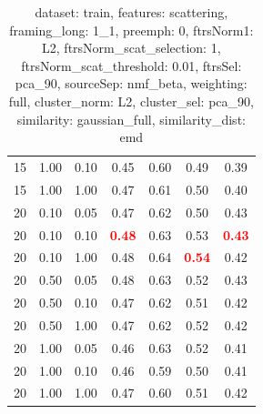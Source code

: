 \documentclass[12pt,a4paper,fleqn]{tufte-handout}
\begin{document}
\begin{table}
\begin{center}
\begin{tabular}{lllcccc}
15 & 1.00 & 0.10 & 0.45 & 0.60 & 0.49 & 0.39 \\    
15 & 1.00 & 1.00 & 0.47 & 0.61 & 0.50 & 0.40 \\    
20 & 0.10 & 0.05 & 0.47 & 0.62 & 0.50 & 0.43 \\    
20 & 0.10 & 0.10 & \textbf{\textcolor{red}{0.48}} & 0.63 & 0.53 & \textbf{\textcolor{red}{0.43}} \\    
20 & 0.10 & 1.00 & 0.48 & 0.64 & \textbf{\textcolor{red}{0.54}} & 0.42 \\    
20 & 0.50 & 0.05 & 0.48 & 0.63 & 0.52 & 0.43 \\    
20 & 0.50 & 0.10 & 0.47 & 0.62 & 0.51 & 0.42 \\    
20 & 0.50 & 1.00 & 0.47 & 0.62 & 0.52 & 0.42 \\    
20 & 1.00 & 0.05 & 0.46 & 0.63 & 0.52 & 0.41 \\    
20 & 1.00 & 0.10 & 0.46 & 0.59 & 0.50 & 0.41 \\    
20 & 1.00 & 1.00 & 0.47 & 0.60 & 0.51 & 0.42 \\    
\end{tabular}    
\end{center}    
\caption{dataset: train, features: scattering, framing\_long: 1\_1, preemph: 0, ftrsNorm1: L2, ftrsNorm\_scat\_selection: 1, ftrsNorm\_scat\_threshold: 0.01, ftrsSel: pca\_90, sourceSep: nmf\_beta, weighting: full, cluster\_norm: L2, cluster\_sel: pca\_90, similarity: gaussian\_full, similarity\_dist: emd}    
\label{datasetrFeaturscFraminlong1_1Preemp0Ftrsnorm1L2Ftrsnoscatselect1Ftrsnoscatthresh0.01Ftrsselpc90SourcesepnmbeWeightfuClustenormL2Clusteselpc90SimilagafuSimiladistem}    
\end{table}    
 
\end{document}
